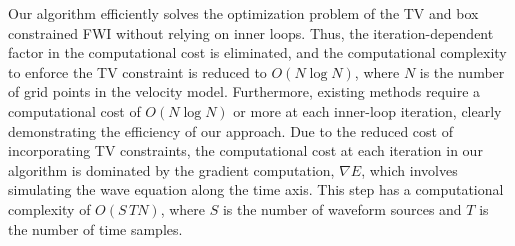 Our algorithm efficiently solves the optimization problem of the TV and box constrained FWI without relying on inner loops.
Thus, the iteration-dependent factor in the computational cost is eliminated, and the computational complexity to enforce the TV constraint is reduced to $O(N \log N)$, where $N$ is the number of grid points in the velocity model.
Furthermore, existing methods require a computational cost of $O(N \log N)$ or more at each inner-loop iteration, clearly demonstrating the efficiency of our approach.
Due to the reduced cost of incorporating TV constraints, the computational cost at each iteration in our algorithm is dominated by the gradient computation, $\nabla E$, which involves simulating the wave equation along the time axis.
This step has a computational complexity of $O(S\, TN)$, where $S$ is the number of waveform sources and $T$ is the number of time samples.






